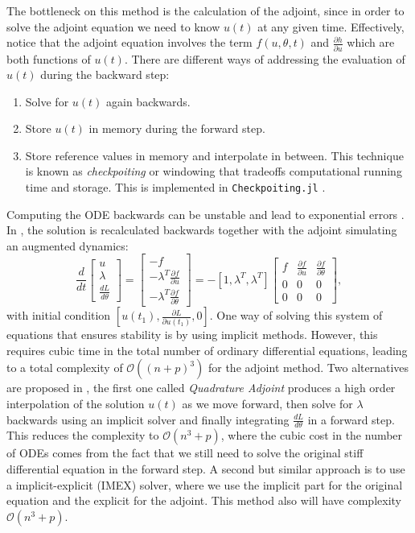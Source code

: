 The bottleneck on this method is the calculation of the adjoint, since in order to solve the adjoint equation we need to know $u(t)$ at any given time. 
Effectively, notice that the adjoint equation involves the term $f(u, \theta, t)$ and $\frac{\partial h}{\partial u}$ which are both functions of $u(t)$. 
There are different ways of addressing the evaluation of $u(t)$ during the backward step:
\begin{enumerate}[label=(\roman*)]
    \item Solve for $u(t)$ again backwards.
    \item Store $u(t)$ in memory during the forward step.
    \item Store reference values in memory and interpolate in between. 
    This technique is known as \textit{checkpoiting} or windowing that tradeoffs computational running time and storage.
    This is implemented in \texttt{Checkpoiting.jl} \cite{Checkpoiting_2023}.
\end{enumerate} 
Computing the ODE backwards can be unstable and lead to exponential errors \cite{kim_stiff_2021}. 
In \cite{chen_neural_2019}, the solution is recalculated backwards together with the adjoint simulating an augmented dynamics: 
\begin{equation}
    \frac{d}{dt}
    \begin{bmatrix}
       u \\
       \lambda \\
       \frac{dL}{d\theta}
    \end{bmatrix}
    = 
    \begin{bmatrix}
       -f \\
       - \lambda^T \frac{\partial f}{\partial u} \\
       - \lambda^T \frac{\partial f}{\partial \theta}
    \end{bmatrix}
    = 
    - [ 1, \lambda^T, \lambda^T ]
    \begin{bmatrix}
       f & \frac{\partial f}{\partial u} & \frac{\partial f}{\partial \theta} \\
       0 & 0 & 0 \\
       0 & 0 & 0
    \end{bmatrix},
\end{equation}
with initial condition $[u(t_1), \frac{\partial L}{\partial u(t_1)}, 0]$. One way of solving this system of equations that ensures stability is by using implicit methods. However, this requires cubic time in the total number of ordinary differential equations, leading to a total complexity of $\mathcal O((n+p)^3)$ for the adjoint method. Two alternatives are proposed in \cite{kim_stiff_2021}, the first one called \textit{Quadrature Adjoint} produces a high order interpolation of the solution $u(t)$ as we move forward, then solve for $\lambda$ backwards using an implicit solver and finally integrating $\frac{dL}{d\theta}$ in a forward step. This reduces the complexity to $\mathcal O (n^3 + p)$, where the cubic cost in the number of ODEs comes from the fact that we still need to solve the original stiff differential equation in the forward step. A second but similar approach is to use a implicit-explicit (IMEX) solver, where we use the implicit part for the original equation and the explicit for the adjoint. This method also will have complexity $\mathcal O (n^3 + p)$.